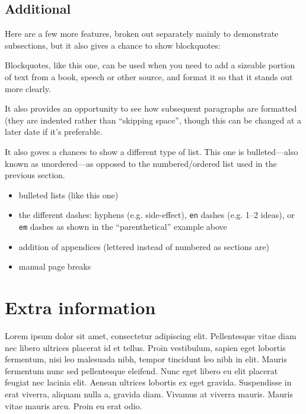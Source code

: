 \documentclass[11pt,a4paper]{article}
\begin{document}
\subsection{Additional}

Here are a few more features, broken out separately mainly to demonstrate
subsections, but it also gives a chance to show blockquotes:
\begin{displayquote}

Blockquotes, like this one, can be used when  you need to add a sizeable
portion of text from a book, speech or other source, and format it so that it
stands out more clearly.
\end{displayquote}

It also provides an opportunity to see how subsequent paragraphs are formatted
(they are indented rather than ``skipping space'', though this can be changed at
a later date if it's preferable.

It also goves a chances to show a different type of list. This one is
bulleted---also known as unordered---as opposed to the numbered/ordered list used
in the previous section.
\begin{itemize}
\item 
bulleted lists (like this one)

\item 
the different dashes: hyphens (e.g. side-effect), \verb|en| dashes (e.g. 1--2 ideas),
or \verb|em| dashes as shown in the ``parenthetical'' example above

\item 
addition of appendices (lettered instead of numbered as sections are)

\item 
manual page breaks

\end{itemize}
\pagebreak

\appendix

\section{Extra information}

Lorem ipsum dolor sit amet, consectetur adipiscing elit. Pellentesque vitae diam
nec libero ultrices placerat id et tellus. Proin vestibulum, sapien eget lobortis
fermentum, nisi leo malesuada nibh, tempor tincidunt leo nibh in elit. Mauris
fermentum nunc sed pellentesque eleifend. Nunc eget libero eu elit placerat
feugiat nec lacinia elit. Aenean ultrices lobortis ex eget gravida. Suspendisse
in erat viverra, aliquam nulla a, gravida diam. Vivamus at viverra mauris. Mauris
vitae mauris arcu. Proin eu erat odio.
\pagebreak

\printbibliography


\printindex
\end{document}
